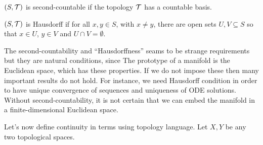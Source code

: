 \begin{definition}
	$(S,\mathcal{T})$ is second-countable if the topology $\mathcal{T}$ has a countable basis.
\end{definition}

\begin{definition}
	$(S,\mathcal{T})$ is Hausdorff if for all $x,y \in S$, with $x\ne y$, there are open sets $U, V \subseteq S$ so that $x \in U$, $y\in V$ and $U\cap V=\emptyset$.
	\begin{figure}[H]
		\centering
	\end{figure}
\end{definition}

The second-countability and ``Hausdorffness'' seams to be strange requirements but they are natural conditions, since The prototype of a manifold is the Euclidean space, which has these properties. If we do not impose these then many important results do not hold. For instance, we need Hausdorff condition in order to have unique convergence of sequences and uniqueness of ODE solutions.
Without second-countability, it is not certain that we can embed the manifold in a finite-dimensional Euclidean space.

Let's now define continuity in terms using topology language. Let $X, Y$ be any two topological spaces.

